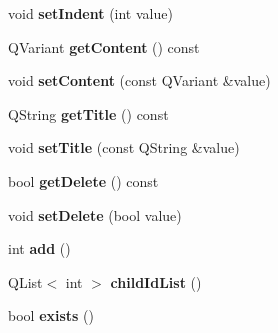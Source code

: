 \begin{DoxyCompactItemize}
\item 
void {\bfseries set\+Indent} (int value)\hypertarget{class_p_l_m_db_paper_aa1e71597f038c5ecf392f18f1d1febf8}{}\label{class_p_l_m_db_paper_aa1e71597f038c5ecf392f18f1d1febf8}

\item 
Q\+Variant {\bfseries get\+Content} () const \hypertarget{class_p_l_m_db_paper_ad4e2542f29ceee25765777a57f808906}{}\label{class_p_l_m_db_paper_ad4e2542f29ceee25765777a57f808906}

\item 
void {\bfseries set\+Content} (const Q\+Variant \&value)\hypertarget{class_p_l_m_db_paper_a555d02ec899e1f27f0457720749c9cba}{}\label{class_p_l_m_db_paper_a555d02ec899e1f27f0457720749c9cba}

\item 
Q\+String {\bfseries get\+Title} () const \hypertarget{class_p_l_m_db_paper_a0d5fb9abf891e64d04126a1815d0162d}{}\label{class_p_l_m_db_paper_a0d5fb9abf891e64d04126a1815d0162d}

\item 
void {\bfseries set\+Title} (const Q\+String \&value)\hypertarget{class_p_l_m_db_paper_a5abd5c4760d8ce7e7569fa127d3fcf94}{}\label{class_p_l_m_db_paper_a5abd5c4760d8ce7e7569fa127d3fcf94}

\item 
bool {\bfseries get\+Delete} () const \hypertarget{class_p_l_m_db_paper_a5812d8a6ae7e204cc8f88cbfb4992aa2}{}\label{class_p_l_m_db_paper_a5812d8a6ae7e204cc8f88cbfb4992aa2}

\item 
void {\bfseries set\+Delete} (bool value)\hypertarget{class_p_l_m_db_paper_a296b49e1a52e361f25ded52bd9b06884}{}\label{class_p_l_m_db_paper_a296b49e1a52e361f25ded52bd9b06884}

\item 
int {\bfseries add} ()\hypertarget{class_p_l_m_db_paper_a387aff393fce92901937c306d5a14a27}{}\label{class_p_l_m_db_paper_a387aff393fce92901937c306d5a14a27}

\item 
Q\+List$<$ int $>$ {\bfseries child\+Id\+List} ()\hypertarget{class_p_l_m_db_paper_a4553b9bc043e4a07a42c46d3fa1449c1}{}\label{class_p_l_m_db_paper_a4553b9bc043e4a07a42c46d3fa1449c1}

\item 
bool {\bfseries exists} ()\hypertarget{class_p_l_m_db_paper_ab7b943731ea3823a7ea87c2a2f32149c}{}\label{class_p_l_m_db_paper_ab7b943731ea3823a7ea87c2a2f32149c}


\end{DoxyCompactItemize}
